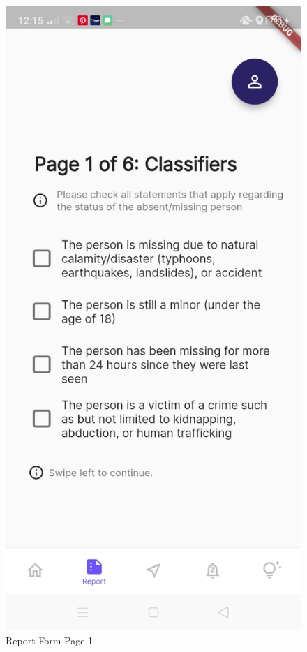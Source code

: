 \begin{figure}[!h]
    \centering
    \begin{minipage}[c]{0.50\linewidth}
        \centering
        \includegraphics[scale=0.15]{figures/Chapter4/Main/p1.jpg}
        \caption{Report Form Page 1}
        \label{fig:p1}
    \end{minipage}
\end{figure}

